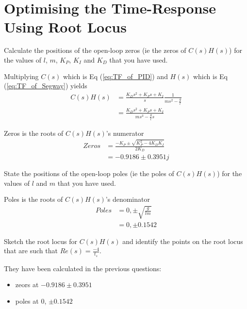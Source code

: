 \section{Optimising the Time-Response Using Root Locus}

\begin{questions}
\setcounter{question}{\value{lastquestioncounter}}

\question[1M]
Calculate the positions of the open-loop zeros (ie the zeros of $C(s)H(s)$) for the values of $l$, $m$, $K_P$, $K_I$ and $K_D$ that you have used.

\begin{solution}
   Multiplying $C(s)$ which is Eq (\ref{eq:TF_of_PID}) and $H(s)$ which is Eq (\ref{eq:TF_of_Segway}) yields
   \begin{equation}\label{eq:C(s)H(s)}
   \begin{split}
   C(s)H(s) &= \frac{K_D s^2 + K_P s + K_I}{s} \frac{1}{m s^2 - \frac{g}{l}} \\
   &= \frac{K_D s^2 + K_P s + K_I}{m s^3 - \frac{g}{l} s}
   \end{split}
   \end{equation}

   Zeros is the roots of $C(s)H(s)$'s numerator
   \begin{align*}
   Zeros &= \frac{-K_P \pm \sqrt{K^2_P - 4 K_D K_I}}{2 K_D} \\
   &= -0.9186 \pm 0.3951j
   \end{align*}
\end{solution}

\question[2E]
State the positions of the open-loop poles (ie the poles of $C(s)H(s)$) for the values of $l$ and $m$ that you have used.

\begin{solution}
   Poles is the roots of $C(s)H(s)$'s denominator
   \begin{align*}
   Poles &= 0, \pm \sqrt{\frac{g}{lm}} \\
   &= 0, \pm 0.1542
   \end{align*}
\end{solution}

\newpage
\question[3M]
Sketch the root locus for $C(s)H(s)$ and identify the points on the root locus that are such that $Re(s) = \frac{-4}{t_s}$.

\begin{solution}

   They have been calculated in the previous questions:
   \begin{itemize}
      \item zeors at $-0.9186 \pm 0.3951$
      \item poles at $0$, $\pm 0.1542$
   \end{itemize}


\end{solution}
\end{questions}
